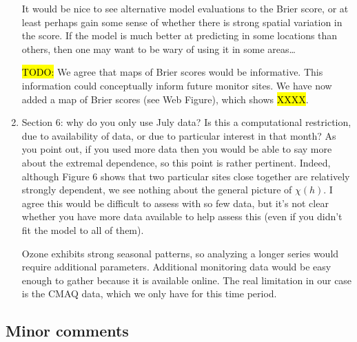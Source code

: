 \documentclass[11pt]{article}
\begin{document}
\begin{enumerate}[1.]
  It would be nice to see alternative model evaluations to the Brier score, or at least perhaps gain some sense of whether there is strong spatial variation in the score. If the model is much better at predicting in some locations than others, then one may want to be wary of using it in some areas\ldots \\

  \begin{response}
    \hl{TODO:}
    We agree that maps of Brier scores would be informative.
    This information could conceptually inform future monitor sites.
    We have now added a map of Brier scores (see Web Figure), which shows \hl{XXXX}.
  \end{response}

  \item Section 6: why do you only use July data? Is this a computational restriction, due to availability of data, or due to particular interest in that month? As you point out, if you used more data then you would be able to say more about the extremal dependence, so this point is rather pertinent. Indeed, although Figure 6 shows that two particular sites close together are relatively strongly dependent, we see nothing about the general picture of $\chi(h)$. I agree this would be difficult to assess with so few data, but it’s not clear whether you have more data available to help assess this (even if you didn’t fit the model to all of them). \\

  \begin{response}
    Ozone exhibits strong seasonal patterns, so analyzing a longer series would require additional parameters.
    Additional monitoring data would be easy enough to gather because it is available online.
    The real limitation in our case is the CMAQ data, which we only have for this time period.
  \end{response}
\end{enumerate}

\subsection*{Minor comments}
\end{document}
